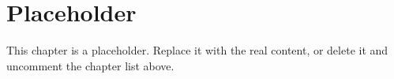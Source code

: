 

\section{Placeholder}
\label{sec:placeholder}

This chapter is a placeholder. Replace it with the real content, or delete it
and uncomment the chapter list above.
